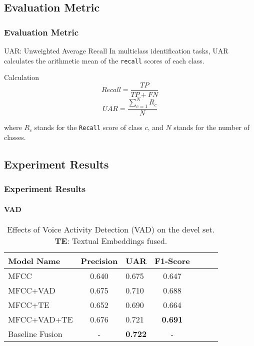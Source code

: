 \documentclass[
	11pt, %
]{beamer}
\begin{document}

\subsection{Evaluation Metric}
\begin{frame}
	\frametitle{Evaluation Metric}
	
	\begin{block}{UAR: Unweighted Average Recall}
		In multiclass identification tasks, \alert{UAR} calculates the arithmetic mean of the \texttt{recall} scores of each class.
	\end{block}
	
	\smallskip %
	
	\begin{exampleblock}{Calculation}
		$$ Recall = \frac{TP}{TP+FN} $$
		$$ UAR = \frac{\sum_{c=1}^NR_c}{N} $$
	\end{exampleblock}
	
	\smallskip %
	
	where $R_c$ stands for the \texttt{Recall} score of class $c$, and $N$ stands for the number of classes.
\end{frame}


\subsection{Experiment Results}

\begin{frame}
	\frametitle{Experiment Results}
	\framesubtitle{VAD}
	
    \begin{table}[t]
      \caption{Effects of Voice Activity Detection (VAD) on the devel set. \textbf{TE}: Textual Embeddings fused.}
      \label{tab:VAD}
      \centering
      \begin{tabular}{ lclclcl }
        \toprule
        Model Name & Precision & UAR    & F1-Score      \\
        \midrule
        MFCC                & 0.640   & 0.675   & 0.647   \\
        MFCC+VAD            & 0.675   & 0.710   & 0.688   \\
        MFCC+TE             & 0.652   & 0.690   & 0.664   \\
        MFCC+VAD+TE         & 0.676   & 0.721   & \textbf{0.691}   \\
        Baseline Fusion     & -       & \textbf{0.722}   & - \\
        \bottomrule
      \end{tabular}
    \end{table}
\end{frame}
\end{document}
